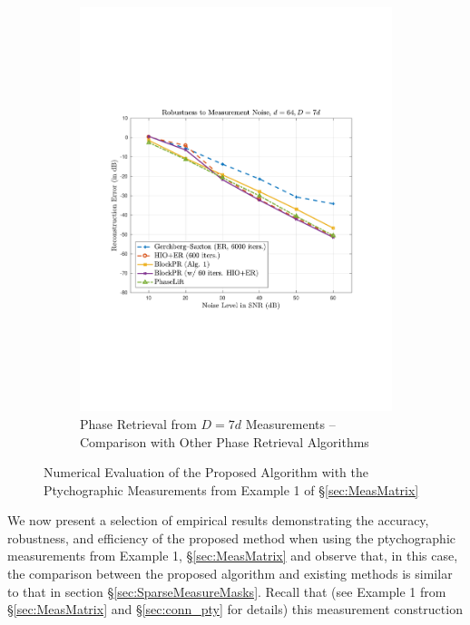 \begin{figure}[hbtp]
\begin{subfigure}[b]{0.8\textwidth}
\includegraphics[clip=true, trim = 0.75in 2.75in 1in 2.5in,scale=0.6]{pics/robustness600_Fourier}
\caption{Phase Retrieval from $D=7d$ Measurements -- Comparison with Other Phase Retrieval Algorithms}
\label{fig:noise_robust_ptych}
\end{subfigure}
\caption{Numerical Evaluation of the Proposed Algorithm with the Ptychographic Measurements from
    Example 1 of \S \ref{sec:MeasMatrix}}
\label{fig:ptych_meas}
\end{figure}
%
{ We now present a selection of empirical results demonstrating the accuracy, robustness, and efficiency of the proposed method when using the ptychographic measurements from Example 1, \S\ref{sec:MeasMatrix} and observe that, in this case, the comparison between the proposed algorithm and existing methods is similar to that in section \S\ref{sec:SparseMeasureMasks}.}  Recall that (see Example 1 from \S \ref{sec:MeasMatrix} and \S \ref{sec:conn_pty} for details) this measurement construction

